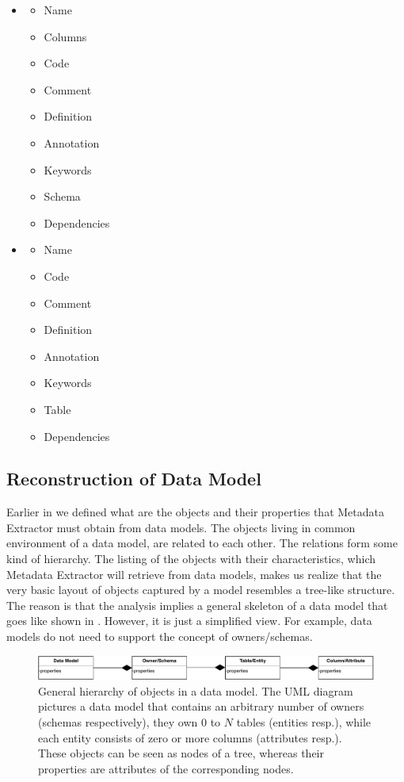 \begin{itemize}
	\item {}
	\begin{itemize}
		\item Name 
		\item Columns
		\item Code 
		\item Comment
		\item Definition
		\item Annotation
		\item Keywords
		\item Schema
		\item Dependencies
	\end{itemize}
	\item {}
	\begin{itemize}
		\item Name 
		\item Code 
		\item Comment
		\item Definition
		\item Annotation
		\item Keywords
		\item Table
		\item Dependencies
	\end{itemize}
\end{itemize}

\subsection{Reconstruction of Data Model}

Earlier in  we defined what are the objects and their properties that Metadata Extractor must obtain from data models.
The objects living in common environment of a data model, are related to each other. The relations form some kind of hierarchy.
The listing of the objects with their characteristics, which Metadata Extractor will retrieve from data models, makes us realize that the very basic layout of objects captured by a model resembles a tree-like structure.
The reason is that the analysis implies a general skeleton of a data model that goes like shown in . However, it is just a simplified view. For example, data models do not need to support the concept of owners/schemas.

\begin{figure}[H]
	\centering
	\includegraphics[width=14cm]{../img/DataModelHierarchy}
	\caption[Hierarchy of Objects in a Data Model]{General hierarchy of objects in a data model. The UML diagram pictures a data model that contains an arbitrary number of owners (schemas respectively), they own $0$ to $N$ tables (entities resp.), while each entity consists of zero or more columns (attributes resp.). These objects can be seen as nodes of a tree, whereas their properties are attributes of the corresponding nodes.}
	\label{DataModelHierarchy}
\end{figure} 

